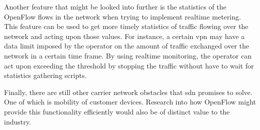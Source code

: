 Another feature that might be looked into further is the statistics of the OpenFlow flows in the network when trying to implement realtime metering. This feature can be used to get more timely statistics of traffic flowing over the network and acting upon those values. For instance, a certain \ac{vpn} may have a data limit imposed by the operator on the amount of traffic exchanged over the network in a certain time frame. By using realtime monitoring, the operator can act upon exceeding the threshold by stopping the traffic without have to wait for statistics gathering scripts. 

Finally, there are still other carrier network obstacles that \ac{sdn} promises to solve. One of which is mobility of customer devices. Research into how OpenFlow might provide this functionality efficiently would also be of distinct value to the industry.

